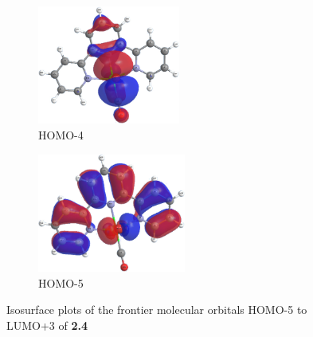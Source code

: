 \begin{figure}[!ht]
\begin{subfigure}[b]{0.31\textwidth}
  \includegraphics[clip=true, width=\textwidth, height=39mm, keepaspectratio]{images/mos/4h-4.eps}
  \caption{HOMO-4}
 \end{subfigure}
 \begin{subfigure}[b]{0.31\textwidth}
  \includegraphics[clip=true, width=\textwidth, height=39mm, keepaspectratio]{images/mos/4h-5.eps}
  \caption{HOMO-5}
 \end{subfigure}
\caption[Molecular orbitals HOMO-5 to LUMO+3 of \textbf{2.4}]{Isosurface plots of the frontier molecular orbitals HOMO-5 to LUMO+3 of \textbf{2.4}}
\label{fig.mo24}
\end{figure}

